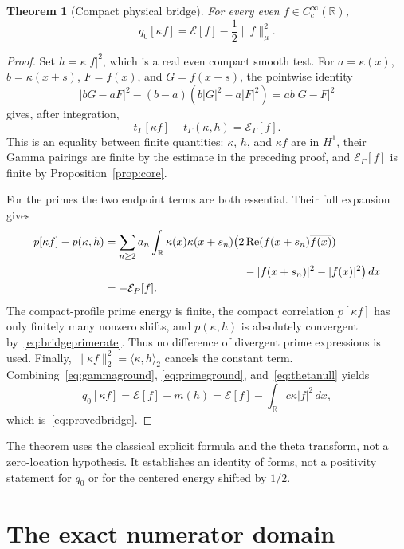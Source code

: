 \documentclass[11pt,a4paper]{article}
\numberwithin{equation}{section}
\newtheorem{theorem}{Theorem}[section]
\theoremstyle{remark}
\newcommand{\R}{\mathbb R}
\newcommand{\E}{\mathcal E}
\newcommand{\tg}{t_{\Gamma}}
\newcommand{\ip}[2]{\langle #1,#2\rangle}
\newcommand{\norm}[1]{\lVert #1\rVert}
\begin{document}
\begin{theorem}[Compact physical bridge]\label{thm:compactbridge}
For every even $f\in C_c^\infty(\R)$,
\begin{equation}\label{eq:provedbridge}
 q_0[\kappa f]=\E[f]-\frac12\norm{f}_\mu^2.
\end{equation}
\end{theorem}
\begin{proof}
Set $h=\kappa|f|^2$, which is a real even compact smooth test. For $a=\kappa(x)$, $b=\kappa(x+s)$, $F=f(x)$, and $G=f(x+s)$, the pointwise identity
\[
 |bG-aF|^2-(b-a)(b|G|^2-a|F|^2)=ab|G-F|^2
\]
gives, after integration,
\begin{equation}\label{eq:gammaground}
 \tg[\kappa f]-\tg(\kappa,h)=\E_\Gamma[f].
\end{equation}
This is an equality between finite quantities: $\kappa$, $h$, and $\kappa f$ are in $H^1$, their Gamma pairings are finite by the estimate in the preceding proof, and $\E_\Gamma[f]$ is finite by Proposition~\ref{prop:core}.

For the primes the two endpoint terms are both essential. Their full expansion gives
\begin{align}\label{eq:primeground}
 p[\kappa f]-p(\kappa,h)
 &=\sum_{n\ge2}a_n\int_\R\kappa(x)\kappa(x+s_n)
       \bigl(2\operatorname{Re}(f(x+s_n)\overline{f(x)})\notag\\
 &\hspace{44mm}-|f(x+s_n)|^2-|f(x)|^2\bigr)\,dx\notag\\
 &=-\E_P[f].
\end{align}
The compact-profile prime energy is finite, the compact correlation $p[\kappa f]$ has only finitely many nonzero shifts, and $p(\kappa,h)$ is absolutely convergent by~\eqref{eq:bridgeprimerate}. Thus no difference of divergent prime expressions is used. Finally,
$\norm{\kappa f}_2^2=\ip{\kappa}{h}_2$ cancels the constant term. Combining~\eqref{eq:gammaground}, \eqref{eq:primeground}, and~\eqref{eq:thetanull} yields
\[
 q_0[\kappa f]=\E[f]-m(h)
             =\E[f]-\int_\R c\kappa|f|^2\,dx,
\]
which is~\eqref{eq:provedbridge}.
\end{proof}

The theorem uses the classical explicit formula and the theta transform, not a zero-location hypothesis. It establishes an identity of forms, not a positivity statement for $q_0$ or for the centered energy shifted by $1/2$.

\section{The exact numerator domain}\label{sec:domain}
\end{document}
